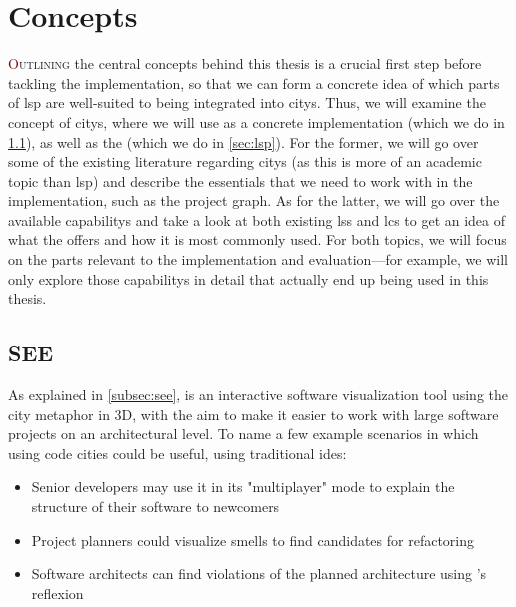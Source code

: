 \documentclass[../thesis]{subfiles}
\begin{document}
\chapter{Concepts}\label{ch:concepts}

\lettrine[lines=3]{\textcolor{Maroon}{O}}{utlining} the central concepts behind this thesis is a crucial first step before tackling the implementation, so that we can form a concrete idea of which parts of \gls{lsp} are well-suited to being integrated into \glspl{city}.
Thus, we will examine the concept of \glspl{city}, where we will use \SEE{} as a concrete implementation (which we do in \cref{sec:see}), as well as the  (which we do in \cref{sec:lsp}).
For the former, we will go over some of the existing literature regarding \glspl{city} (as this is more of an academic topic than \gls{lsp}) and describe the essentials that we need to work with in the implementation, such as the project graph.
As for the latter, we will go over the available \glspl{capability} and take a look at both existing \glspl{ls} and \glspl{lc} to get an idea of what the  offers and how it is most commonly used.
For both topics, we will focus on the parts relevant to the implementation and evaluation---for example, we will only explore those \glspl{capability} in detail that actually end up being used in this thesis.

\section{SEE}\label{sec:see}

As explained in \cref{subsec:see}, \SEE{} is an interactive software visualization tool using the \gls{city} metaphor in 3D, with the aim to make it easier to work with large software projects on an architectural level.
To name a few example scenarios in which using code cities could be useful,  using traditional \glspl{ide}:
\begin{itemize}
	\item Senior developers may use it in its "multiplayer" mode to explain the structure of their software to newcomers
	\item Project planners could visualize \glspl{smell} to find candidates for refactoring~\cite{galperin2021}
	\item Software architects can find violations of the planned architecture using \SEE{}'s \gls{reflexion}
\end{itemize}
\end{document}
